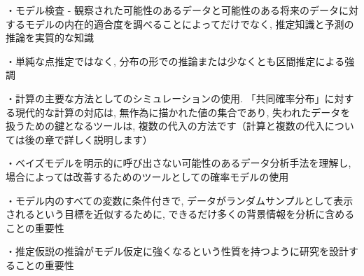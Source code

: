 \documentclass[10pt,dvipdfmx,a4]{beamer}
\begin{document}

\begin{frame}
・モデル検査 - 観察された可能性のあるデータと可能性のある将来のデータに対するモデルの内在的適合度を調べることによってだけでなく, 推定知識と予測の推論を実質的な知識

・単純な点推定ではなく, 分布の形での推論または少なくとも区間推定による強調

・計算の主要な方法としてのシミュレーションの使用.
「共同確率分布」に対する現代的な計算の対応は, 無作為に描かれた値の集合であり, 失われたデータを扱うための鍵となるツールは, 複数の代入の方法です（計算と複数の代入については後の章で詳しく説明します）

・ベイズモデルを明示的に呼び出さない可能性のあるデータ分析手法を理解し, 場合によっては改善するためのツールとしての確率モデルの使用

・モデル内のすべての変数に条件付きで, データがランダムサンプルとして表示されるという目標を近似するために, できるだけ多くの背景情報を分析に含めることの重要性

・推定仮説の推論がモデル仮定に強くなるという性質を持つように研究を設計することの重要性
\end{frame}

\end{document}
